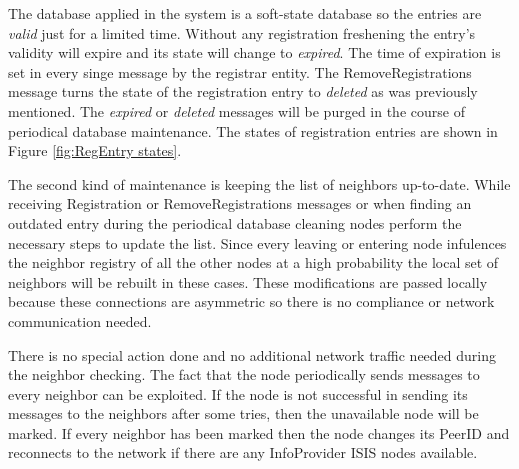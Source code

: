 \documentclass{book}
\begin{document}
The database applied in the system is a soft-state database so the entries are {\it valid} just for a limited time. Without any registration freshening the entry's validity will expire and its state will change to {\it expired}. The time of expiration is set in every singe message by the registrar entity. The RemoveRegistrations message turns the state of the registration entry to {\it deleted} as was previously mentioned. The {\it expired} or {\it deleted} messages will be purged in the course of periodical database maintenance. The states of registration entries are shown in Figure \ref{fig:RegEntry states}.
\begin{figure}[ht]
\end{figure}

The second kind of maintenance is keeping the list of neighbors up-to-date. While receiving Registration or RemoveRegistrations messages or when finding an outdated entry during the periodical database cleaning nodes perform the necessary steps to update the list. Since every leaving or entering node infulences the neighbor registry of all the other nodes at a high probability the local set of neighbors will be rebuilt in these cases. These modifications are passed locally because these connections are asymmetric so there is no compliance or network communication needed.

There is no special action done and no additional network traffic needed during the neighbor checking. The fact that the node periodically sends messages to every neighbor can be exploited. If the node is not successful in sending its messages to the neighbors after some tries, then the unavailable node will be marked. If every neighbor has been marked then the node changes its PeerID and reconnects to the network if there are any InfoProvider ISIS nodes available.
\end{document}
